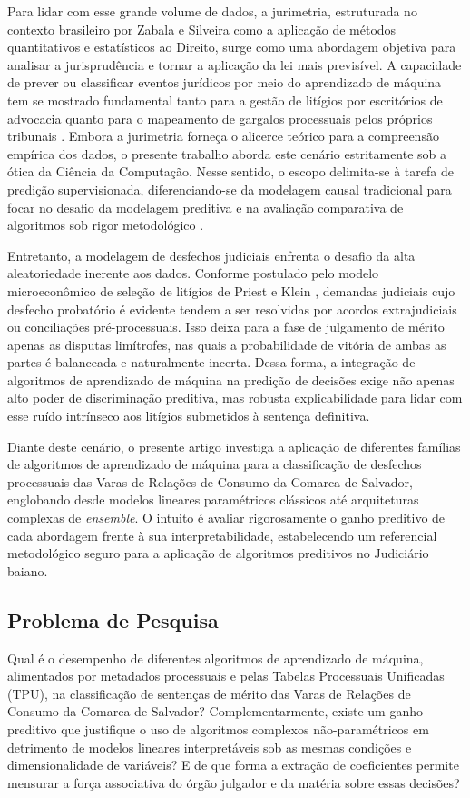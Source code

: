 \documentclass[conference]{IEEEtran}
\begin{document}
Para lidar com esse grande volume de dados, a jurimetria, estruturada no contexto brasileiro por Zabala e Silveira \cite{zabala2014} como a aplicação de métodos quantitativos e estatísticos ao Direito, surge como uma abordagem objetiva para analisar a jurisprudência e tornar a aplicação da lei mais previsível. A capacidade de prever ou classificar eventos jurídicos por meio do aprendizado de máquina tem se mostrado fundamental tanto para a gestão de litígios por escritórios de advocacia quanto para o mapeamento de gargalos processuais pelos próprios tribunais \cite{aletras2016, katz2017}. Embora a jurimetria forneça o alicerce teórico para a compreensão empírica dos dados, o presente trabalho aborda este cenário estritamente sob a ótica da Ciência da Computação. Nesse sentido, o escopo delimita-se à tarefa de predição supervisionada, diferenciando-se da modelagem causal tradicional para focar no desafio da modelagem preditiva e na avaliação comparativa de algoritmos sob rigor metodológico \cite{izbicki2020}.

Entretanto, a modelagem de desfechos judiciais enfrenta o desafio da alta aleatoriedade inerente aos dados. Conforme postulado pelo modelo microeconômico de seleção de litígios de Priest e Klein \cite{priest1984, trecenti2021}, demandas judiciais cujo desfecho probatório é evidente tendem a ser resolvidas por acordos extrajudiciais ou conciliações pré-processuais. Isso deixa para a fase de julgamento de mérito apenas as disputas limítrofes, nas quais a probabilidade de vitória de ambas as partes é balanceada e naturalmente incerta. Dessa forma, a integração de algoritmos de aprendizado de máquina na predição de decisões exige não apenas alto poder de discriminação preditiva, mas robusta explicabilidade para lidar com esse ruído intrínseco aos litígios submetidos à sentença definitiva.

Diante deste cenário, o presente artigo investiga a aplicação de diferentes famílias de algoritmos de aprendizado de máquina para a classificação de desfechos processuais das Varas de Relações de Consumo da Comarca de Salvador, englobando desde modelos lineares paramétricos clássicos até arquiteturas complexas de \textit{ensemble}. O intuito é avaliar rigorosamente o ganho preditivo de cada abordagem frente à sua interpretabilidade, estabelecendo um referencial metodológico seguro para a aplicação de algoritmos preditivos no Judiciário baiano.

\subsection{Problema de Pesquisa}
Qual é o desempenho de diferentes algoritmos de aprendizado de máquina, alimentados por metadados processuais e pelas Tabelas Processuais Unificadas (TPU), na classificação de sentenças de mérito das Varas de Relações de Consumo da Comarca de Salvador? Complementarmente, existe um ganho preditivo que justifique o uso de algoritmos complexos não-paramétricos em detrimento de modelos lineares interpretáveis sob as mesmas condições e dimensionalidade de variáveis? E de que forma a extração de coeficientes permite mensurar a força associativa do órgão julgador e da matéria sobre essas decisões?
\end{document}
